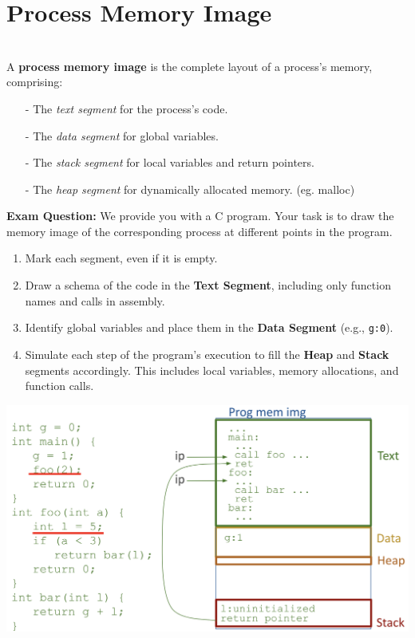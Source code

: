 \documentclass[../../compsys.tex]{subfiles}
\begin{document}
\section{Process Memory Image}
\begin{definition}
  \leavevmode\\[5px]
A \textbf{process memory image} is the complete layout of a process's memory, comprising:
\begin{itemize}
  \item[-] The \emph{text segment} for the process's code.
  \item[-] The \emph{data segment} for global variables.
  \item[-] The \emph{stack segment} for local variables and return pointers.
  \item[-] The \emph{heap segment} for dynamically allocated memory. (eg. malloc)
\end{itemize}
\end{definition}

\vspace{10px}
\noindent
\begin{minipage}{0.45\textwidth}
  \textbf{Exam Question:} We provide you with a C program. Your task is to draw the memory image of the corresponding process at different points in the program.
\begin{enumerate}
    \item Mark each segment, even if it is empty.
    \item Draw a schema of the code in the \textbf{Text Segment}, including only function names and calls in assembly.
    \item Identify global variables and place them in the \textbf{Data Segment} (e.g., \texttt{g:0}).
    \item Simulate each step of the program’s execution to fill the \textbf{Heap} and \textbf{Stack} segments accordingly. This includes local variables, memory allocations, and function calls.
\end{enumerate}
\end{minipage}
\hfill
\vline
\hfill
\begin{minipage}{0.45\textwidth}
    \begin{center}
    \includegraphics[width=1.23\textwidth]{chapters/L4/images/exam.png}
\end{center}
\end{minipage} \\[30px]
\end{document}
